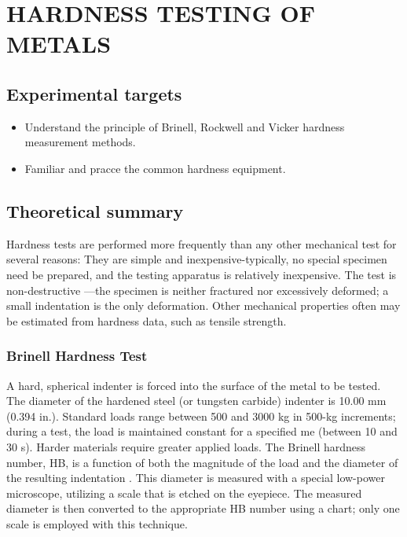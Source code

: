\chapter{HARDNESS TESTING OF METALS}
\section{Experimental targets}
\begin{itemize}
	\item Understand the principle of Brinell, Rockwell and Vicker hardness measurement methods.
	\item Familiar and pracce the common hardness equipment.
\end{itemize}

\section{Theoretical summary}
Hardness tests are performed more frequently than any other mechanical test for several reasons: They are simple and inexpensive-typically, no special specimen need be prepared, and the testing apparatus is relatively inexpensive. The test is non-destructive —the specimen is neither fractured nor excessively deformed;  a  small  indentation  is  the  only  deformation.  Other  mechanical  properties  often  may  be estimated from hardness data, such as tensile strength.
\subsection{Brinell Hardness Test}
A hard, spherical indenter is forced into the surface of the metal to be tested. The diameter of the hardened steel (or tungsten carbide) indenter is 10.00 mm (0.394 in.). Standard loads range between 500 and 3000 kg in 500-kg increments; during a test, the load is maintained constant for a specified me (between 10 and 30 s). Harder materials require greater applied loads. The Brinell hardness number, HB, is a function of both the magnitude of the load and the diameter of the resulting indentation . This diameter  is  measured  with  a  special  low-power  microscope,  utilizing  a  scale  that  is  etched  on  the eyepiece. The measured diameter is then converted to the appropriate HB number using a chart; only one scale is employed with this technique.
